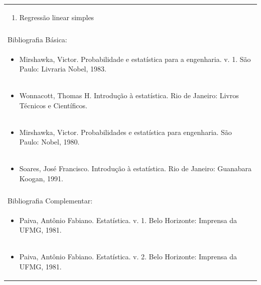 \documentclass[11pt]{article}
\begin{document}
\begin{center}
\begin{longtable}{|p{4cm}|p{4cm}|p{4cm}|p{4cm}|}
\multicolumn{4}{|p{\dimexpr 16cm + 6\tabcolsep\relax}|}{\begin{enumerate}[start=9]\item Regressão linear simples\end{enumerate}}\\
\multicolumn{4}{|p{\dimexpr 16cm + 6\tabcolsep\relax}|}{}\\
\hline
\multicolumn{4}{|p{16cm}|}{Bibliografia Básica:}\\*
\multicolumn{4}{|p{\dimexpr 16cm + 6\tabcolsep\relax}|}{\begin{itemize}\item Mirshawka, Victor. Probabilidade e estatística para a engenharia. v. 1. São Paulo: Livraria Nobel, 1983.\end{itemize}}\\
\multicolumn{4}{|p{\dimexpr 16cm + 6\tabcolsep\relax}|}{\begin{itemize}\item Wonnacott, Thomas H. Introdução à estatística. Rio de Janeiro: Livros Técnicos e Científicos.\end{itemize}}\\
\multicolumn{4}{|p{\dimexpr 16cm + 6\tabcolsep\relax}|}{\begin{itemize}\item Mirshawka, Victor. Probabilidades e estatística para engenharia. São Paulo: Nobel, 1980.\end{itemize}}\\
\multicolumn{4}{|p{\dimexpr 16cm + 6\tabcolsep\relax}|}{\begin{itemize}\item Soares, José Francisco. Introdução à estatística. Rio de Janeiro: Guanabara Koogan, 1991.\end{itemize}}\\
\multicolumn{4}{|p{16cm}|}{}\\
\hline
\multicolumn{4}{|p{16cm}|}{Bibliografia Complementar:}\\*
\multicolumn{4}{|p{\dimexpr 16cm + 6\tabcolsep\relax}|}{\begin{itemize}\item Paiva, Antônio Fabiano. Estatística. v. 1. Belo Horizonte: Imprensa da UFMG, 1981.\end{itemize}}\\
\multicolumn{4}{|p{\dimexpr 16cm + 6\tabcolsep\relax}|}{\begin{itemize}\item Paiva, Antônio Fabiano. Estatística. v. 2. Belo Horizonte: Imprensa da UFMG, 1981.\end{itemize}}\\

\end{longtable}
\end{center}
\end{document}
